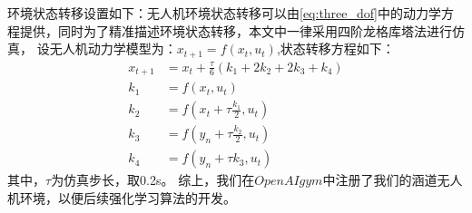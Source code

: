 环境状态转移设置如下：无人机环境状态转移可以由\autoref{eq:three_dof}中的动力学方程提供，同时为了精准描述环境状态转移，本文中一律采用四阶龙格库塔法进行仿真，
设无人机动力学模型为：$x_{t+1}=f\left(x_{t}, u_{t}\right)$,状态转移方程如下：
\begin{align}
    x_{t+1}&=x_{t}+\frac{\tau}{6}\left(k_{1}+2 k_{2}+2 k_{3}+k_{4}\right)\\
    k_{1} & =f\left(x_{t}, u_{t}\right) \\
    k_{2} & =f\left(x_{t}+\tau \frac{k_{1}}{2},u_{t}\right) \\
    k_{3} & =f\left(y_{n}+\tau \frac{k_{2}}{2}, u_{t}\right) \\
    k_{4} & =f\left(y_{n}+\tau k_{3}, u_{t}\right)
\end{align}
其中，$\tau$为仿真步长，取0.2s。
综上，我们在$Open AI gym$中注册了我们的涵道无人机环境，以便后续强化学习算法的开发。
